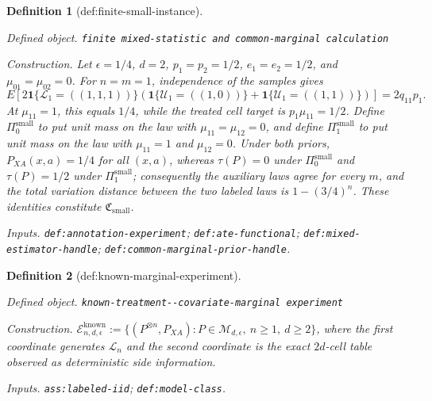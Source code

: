 \documentclass{article}
\newtheorem{definition}{Definition}
\begin{document}
\begin{definition}[def:finite-small-instance]\label{def:finite-small-instance}
\par\smallskip\noindent\emph{Defined object.} \texttt{finite mixed-\allowbreak{}statistic and common-\allowbreak{}marginal calculation}
\par\smallskip\noindent\emph{Construction.} Let \(\epsilon=1/4\), \(d=2\), \(p_1=p_2=1/2\), \(e_1=e_2=1/2\), and \(\mu_{01}=\mu_{02}=0\). For \(n=m=1\), independence of the samples gives \[E\!\left[2\mathbf 1\{\mathcal L_1=((1,1,1))\}\left(\mathbf 1\{\mathcal U_1=((1,0))\}+\mathbf 1\{\mathcal U_1=((1,1))\}\right)\right]=2q_{11}p_1.\] At \(\mu_{11}=1\), this equals \(1/4\), while the treated cell target is \(p_1\mu_{11}=1/2\). Define \(\Pi_0^{\mathrm{small}}\) to put unit mass on the law with \(\mu_{11}=\mu_{12}=0\), and define \(\Pi_1^{\mathrm{small}}\) to put unit mass on the law with \(\mu_{11}=1\) and \(\mu_{12}=0\). Under both priors, \(P_{XA}(x,a)=1/4\) for all \((x,a)\), whereas \(\tau(P)=0\) under \(\Pi_0^{\mathrm{small}}\) and \(\tau(P)=1/2\) under \(\Pi_1^{\mathrm{small}}\); consequently the auxiliary laws agree for every \(m\), and the total variation distance between the two labeled laws is \(1-(3/4)^n\). These identities constitute \(\mathfrak C_{\mathrm{small}}\).
\par\smallskip\noindent\emph{Inputs.} \texttt{def:\allowbreak{}annotation-\allowbreak{}experiment}; \texttt{def:\allowbreak{}ate-\allowbreak{}functional}; \texttt{def:\allowbreak{}mixed-\allowbreak{}estimator-\allowbreak{}handle}; \texttt{def:\allowbreak{}common-\allowbreak{}marginal-\allowbreak{}prior-\allowbreak{}handle}.
\end{definition}

\begin{definition}[def:known-marginal-experiment]\label{def:known-marginal-experiment}
\par\smallskip\noindent\emph{Defined object.} \texttt{known-\allowbreak{}treatment-\allowbreak{}-\allowbreak{}covariate-\allowbreak{}marginal experiment}
\par\smallskip\noindent\emph{Construction.} \(\mathcal E^{\mathrm{known}}_{n,d,\epsilon}:=\{(P^{\otimes n},P_{XA}):P\in\mathcal M_{d,\epsilon},\ n\ge1,\ d\ge2\}\), where the first coordinate generates \(\mathcal L_n\) and the second coordinate is the exact \(2d\)-cell table observed as deterministic side information.
\par\smallskip\noindent\emph{Inputs.} \texttt{ass:\allowbreak{}labeled-\allowbreak{}iid}; \texttt{def:\allowbreak{}model-\allowbreak{}class}.
\end{definition}
\end{document}
